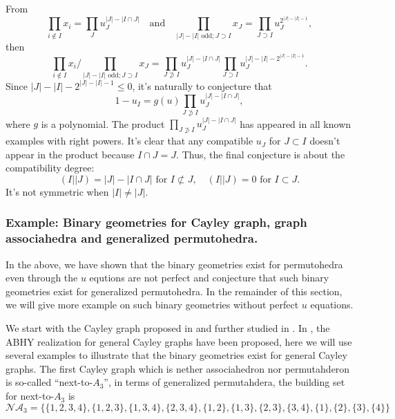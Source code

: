 \documentclass[hidelinks,12pt]{article}
\begin{document}
From
\[
\prod_{i\not\in I}x_i=\prod_J u_J^{|J|-|I\cap J|}
\quad\text{and}\quad
\prod_{|J|-|I| \text{ odd}; J\supset I}x_J
=
\prod_{J\supset I}u_J^{2^{|J|-|I|-1}},
\]
then
\[
\prod_{i\not\in I}x_i\bigg/\prod_{|J|-|I| \text{ odd}; J\supset I}x_J
=\prod_{J\not\supset I} u_J^{|J|-|I\cap J|}\prod_{J\supset I} u_J^{|J|-|I|-2^{|J|-|I|-1}}.
\]
Since $|J|-|I|-2^{|J|-|I|-1}\leq 0$, it's naturally to conjecture that
\[
1-u_I=g(u)\prod_{J\not\supset I} u_J^{|J|-|I\cap J|},
\]
where $g$ is a polynomial.
The product $\prod_{J\not\supset I} u_J^{|J|-|I\cap J|}$ has appeared in all known examples with right powers. It's clear that any compatible $u_J$ for $J\subset I$ doesn't appear in the product because $I\cap J=J$. Thus, the final conjecture is about the compatibility degree:
\[
(I||J)=|J|-|I\cap J|\text{ for $I\not\subset J$},\quad  (I||J)=0 \text{ for $I\subset J$}.
\]
It's not symmetric when $|I|\neq |J|$.





\subsubsection{Example: Binary geometries for Cayley graph, graph associahedra and generalized permutohedra. }


In the above, we have shown that the binary geometries exist for permutohedra even through the $u$ equtions are not perfect and conjecture that such binary geometries exist for generalized permutohedra. In the remainder of this section, we will give more example on such binary geometries without perfect $u$ equations.


We start with the Cayley graph proposed in \cite{} and further studied in \cite{}. In \cite{}, the ABHY realization for general Cayley graphs have been proposed, here we will use several examples to illustrate that the binary geometries exist for general Cayley graphs. The first Cayley graph which is nether associahedron nor permutahderon is so-called  ``next-to-$A_{3}$'', in terms of generalized permutahdera, the building set for next-to-$A_{3}$ is 
\begin{equation}
   \mathscr{NA}_{3}=\{\{1,2,3,4\},\{1,2,3\},\{1,3,4\},\{2,3,4\},\{1,2\},\{1,3\},\{2,3\},\{3,4\},\{1\},\{2\},\{3\},\{4\}\}
\end{equation}
\end{document}
